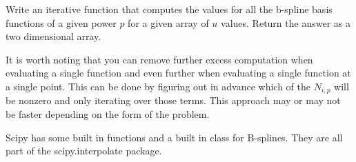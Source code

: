 \begin{problem}
Write an iterative function that computes the values for all the b-spline basis functions of a given power $p$ for a given array of $u$ values. Return the answer as a two dimensional array.
\end{problem}

It is worth noting that you can remove further excess computation when evaluating a single function and even further when evaluating a single function at a single point.
This can be done by figuring out in advance which of the $N_{i,p}$ will be nonzero and only iterating over those terms.
This approach may or may not be faster depending on the form of the problem.

Scipy has some built in functions and a built in class for B-splines.
They are all part of the scipy.interpolate package.
